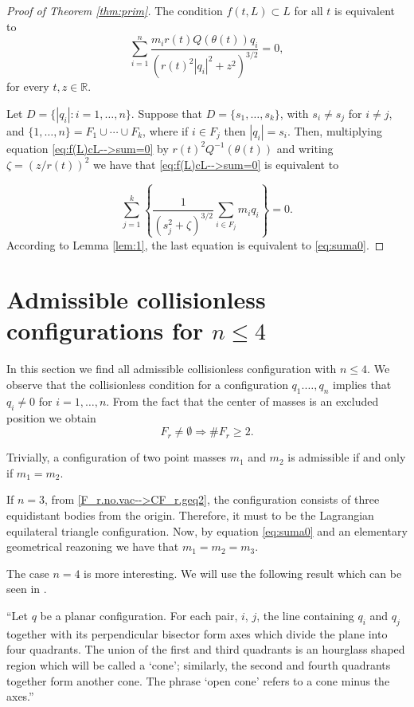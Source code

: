 \documentclass[twoside]{article}
\theoremstyle{remark}
\newcommand{\rr}{\mathbb{R}}
\begin{document}
\begin{proof}[Proof of Theorem \ref{thm:prim}]
The condition $f(t,L)\subset L$ for all $t$ is equivalent to
\begin{equation}\label{eq:f(L)cL-->sum=0}
 \sum_{i=1}^n\frac{m_ir(t)Q(\theta (t))q_i}{\left(r(t)^2|q_i|^2+z^2\right)^{3/2}}=0,
\end{equation}
for every $t,z\in \rr$.

Let $D=\{|q_i|: i=1,\ldots,n\}$.  Suppose that $D=\{s_1,\ldots,s_k\}$, with $s_i\neq s_j$ for $i\neq j$, and  $\{1,\ldots,n\}=F_1\cup \cdots\cup F_k$, where if $i\in F_j$ then $|q_i|=s_i$. Then, multiplying equation \eqref{eq:f(L)cL-->sum=0} by $r(t)^2Q^{-1}(\theta(t))$  and writing $\zeta=(z/r(t))^2$ we have that \eqref{eq:f(L)cL-->sum=0} is equivalent to


\[\sum_{j=1}^k\left\{\frac{1}{(s_j^{2}+\zeta)^{3/2}}\sum_{i\in F_j}m_iq_i\right\}=0.\]
According to Lemma \ref{lem:1}, the last equation is equivalent to \eqref{eq:suma0}.
\end{proof}


\section{Admissible collisionless configurations for $n\leq 4$}\label{sec:addmisibles}

In this section we find all admissible collisionless configuration with $n\leq 4$. We observe that the collisionless condition for a configuration $q_1.\ldots,q_n$ implies that $q_i\neq 0$ for $i=1,\ldots,n$. From the fact that the center of masses is an excluded position we obtain
\begin{equation}\label{F_r.no.vac-->CF_r.geq2}
 F_r\neq \emptyset \Rightarrow \# F_r\geq 2.
\end{equation}



Trivially, a configuration of two point masses $m_1$ and $m_2$ is admissible if and only if $m_1=m_2$.

If $n=3$, from \eqref{F_r.no.vac-->CF_r.geq2}, the configuration consists of three equidistant bodies from the origin. Therefore, it must to be the Lagrangian equilateral triangle configuration. Now, by equation \eqref{eq:suma0} and an elementary geometrical reazoning   we have that $m_1=m_2=m_3$.

The case $n=4$ is more interesting. We will use the following result which can be seen in \cite{moeckel1990central}.

``Let $q$ be a planar configuration. For each pair, $i$, $j$, the line
containing $q_i$ and $q_j$ together with its perpendicular bisector form axes which
divide the plane into four quadrants. The union of the first and third quadrants
is an hourglass shaped region which will be called a `cone'; similarly,
the second and fourth quadrants together form another cone. The phrase `open
cone' refers to a cone minus the axes.''
\end{document}
